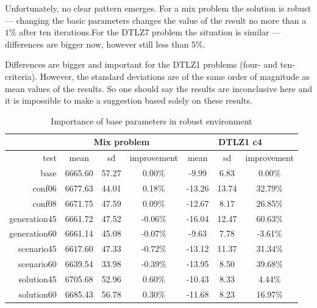 Unfortunately, no clear pattern emerges. For a mix problem the solution is
robust --- changing the basic parameters changes the value of the result no
more than a $1\%$ after ten iterations.For the DTLZ7 problem the situation is
similar --- differences are bigger now, however still less than $5\%$.

Differences are bigger and important for the DTLZ1 problems (four- and
ten-criteria). However, the standard deviations are of the same order of
magnitude as mean values of the results. So one should say the results are
inconclusive here and it is impossible to make a suggestion based solely on
these results.

\begin{table}
  \centering
  \caption{Importance of base parameters in robust environment}
  \label{t:base2_imp_1}
  \begin{tabular}{r c c c c c c}
    & \multicolumn{3}{c}{Mix problem} & \multicolumn{3}{c}{DTLZ1 c4} \\
    \hline
    test & mean & sd & improvement & mean & sd & improvement \\
    \hline
    \hline
    base & 6665.60 & 57.27 & 0.00\% & -9.99 & 6.83 & 0.00\% \\
    conf06 & 6677.63 & 44.01 & 0.18\% & -13.26 & 13.74 & 32.79\% \\
    conf08 & 6671.75 & 47.59 & 0.09\% & -12.67 & 8.17 & 26.85\% \\
    generation45 & 6661.72 & 47.52 & -0.06\% & -16.04 & 12.47 & 60.63\% \\
    generation60 & 6661.14 & 45.08 & -0.07\% & -9.63 & 7.78 & -3.61\% \\
    scenario45 & 6617.60 & 47.33 & -0.72\% & -13.12 & 11.37 & 31.34\% \\
    scenario60 & 6639.54 & 33.98 & -0.39\% & -13.95 & 8.50 & 39.68\% \\
    solution45 & 6705.68 & 52.96 & 0.60\% & -10.43 & 8.33 & 4.44\% \\
    solution60 & 6685.43 & 56.78 & 0.30\% & -11.68 & 8.23 & 16.97\% \\
    \hline
  \end{tabular}
\end{table}

